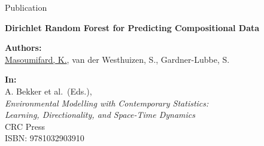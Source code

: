 \begin{frame}{Publication}

\begin{center}
\vfill

\begin{block}{}
\begin{center}
\textbf{Dirichlet Random Forest for Predicting Compositional Data}\\[0.4em]
\end{center}
\end{block}

\vspace{0.5em}

\textbf{Authors:}\\[0.3em]
\underline{Masoumifard, K.}, van der Westhuizen, S., Gardner-Lubbe, S.

\vspace{0.8em}

\textbf{In:}\\[0.3em]
A. Bekker et al.\ (Eds.),\\
\textit{Environmental Modelling with Contemporary Statistics:\\
Learning, Directionality, and Space-Time Dynamics}\\[0.3em]
CRC Press\\[0.3em]
ISBN: 9781032903910

\vfill
\end{center}

\end{frame}